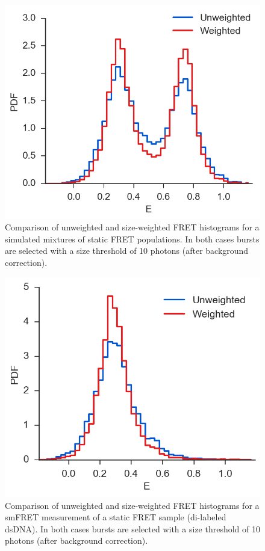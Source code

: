 \documentclass[10pt,letterpaper]{article}
\begin{document}
\begin{figure}[h!]
\begin{center}
\includegraphics[width=0.49\columnwidth]{figures/weight_fret_hist_sim_mixture/weight_fret_hist_sim_mixture}
\caption{\label{fig:weight_fret_sim} Comparison of unweighted and size-weighted FRET histograms for a simulated mixtures of static FRET populations. In both cases bursts are selected with a size threshold of 10 photons (after background correction).%
}
\end{center}
\end{figure}

\begin{figure}[h!]
\begin{center}
\includegraphics[width=0.49\columnwidth]{figures/weight_fret_hist_measurement/weight_fret_hist_measurement}
\caption{\label{fig:weight_fret_meas} Comparison of unweighted and size-weighted FRET histograms for a smFRET measurement of a static FRET sample (di-labeled dsDNA). In both cases bursts are selected with a size threshold of 10 photons (after background correction).%
}
\end{center}
\end{figure}

\nolinenumbers

\end{document}

